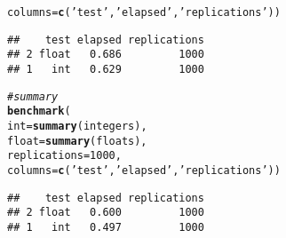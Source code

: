 \documentclass{llncs}\usepackage[]{graphicx}\usepackage[]{color}
\makeatletter
\newcommand{\hlnum}[1]{\textcolor[rgb]{0.686,0.059,0.569}{#1}}%
\newcommand{\hlstr}[1]{\textcolor[rgb]{0.192,0.494,0.8}{#1}}%
\newcommand{\hlcom}[1]{\textcolor[rgb]{0.678,0.584,0.686}{\textit{#1}}}%
\newcommand{\hlstd}[1]{\textcolor[rgb]{0.345,0.345,0.345}{#1}}%
\newcommand{\hlkwc}[1]{\textcolor[rgb]{0.333,0.667,0.333}{#1}}%
\newcommand{\hlkwd}[1]{\textcolor[rgb]{0.737,0.353,0.396}{\textbf{#1}}}%
\newenvironment{kframe}{%
 \def\at@end@of@kframe{}%
 \ifinner\ifhmode%
  \def\at@end@of@kframe{\end{minipage}}%
  \begin{minipage}{\columnwidth}%
 \fi\fi%
 \def\FrameCommand##1{\hskip\@totalleftmargin \hskip-\fboxsep
 \colorbox{shadecolor}{##1}\hskip-\fboxsep
     \hskip-\linewidth \hskip-\@totalleftmargin \hskip\columnwidth}%
 \MakeFramed {\advance\hsize-\width
   \@totalleftmargin\z@ \linewidth\hsize
   \@setminipage}}%
 {\par\unskip\endMakeFramed%
 \at@end@of@kframe}
\newenvironment{knitrout}{}{} %
\makeatother
\begin{document}
\begin{knitrout}
\begin{kframe}
\begin{alltt}
  \hlkwc{columns}\hlstd{=}\hlkwd{c}\hlstd{(}\hlstr{'test'}\hlstd{,} \hlstr{'elapsed'}\hlstd{,} \hlstr{'replications'}\hlstd{))}
\end{alltt}
\begin{lstlisting}[basicstyle=\ttfamily,breaklines=true]
##    test elapsed replications
## 2 float   0.686         1000
## 1   int   0.629         1000
\end{lstlisting}
\begin{alltt}
\hlcom{#summary}
\hlkwd{benchmark}\hlstd{(}
  \hlkwc{int} \hlstd{=} \hlkwd{summary}\hlstd{(integers) ,}
  \hlkwc{float} \hlstd{=} \hlkwd{summary}\hlstd{(floats),}
  \hlkwc{replications} \hlstd{=} \hlnum{1000}\hlstd{,}
  \hlkwc{columns}\hlstd{=}\hlkwd{c}\hlstd{(}\hlstr{'test'}\hlstd{,} \hlstr{'elapsed'}\hlstd{,} \hlstr{'replications'}\hlstd{))}
\end{alltt}
\begin{lstlisting}[basicstyle=\ttfamily,breaklines=true]
##    test elapsed replications
## 2 float   0.600         1000
## 1   int   0.497         1000
\end{lstlisting}
\end{kframe}
\end{knitrout}
\end{document}

